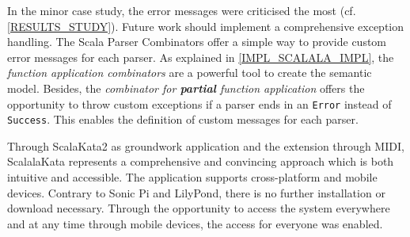 In the minor case study, the error messages were criticised the most (cf. \ref{RESULTS_STUDY}). Future work should implement a comprehensive exception handling. The Scala Parser Combinators offer a simple way to provide custom error messages for each parser. As explained in \ref{IMPL_SCALALA_IMPL}, the \textit{function application combinators} are a powerful tool to create the semantic model. Besides, the \textit{combinator for \textbf{partial} function application} offers the opportunity to throw custom exceptions if a parser ends in an \texttt{Error} instead of \texttt{Success}. This enables the definition of custom messages for each parser.

Through ScalaKata2 as groundwork application and the extension through MIDI, ScalalaKata represents a comprehensive and convincing approach which is both intuitive and accessible. The application supports cross-platform and mobile devices. Contrary to Sonic Pi and LilyPond, there is no further installation or download necessary. Through the opportunity to access the system everywhere and at any time through mobile devices, the access for everyone was enabled.











